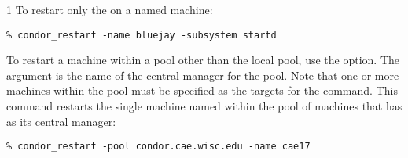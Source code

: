 \begin{ManPage}{\label{man-condor-restart}}{1}
To restart only the  on a named machine:
\begin{verbatim}
% condor_restart -name bluejay -subsystem startd
\end{verbatim}

To restart a machine within a pool
other than the local pool, use the  option.
The argument is the name of the central manager for the pool.
Note that one or more machines within the pool must be
specified as the targets for the command.
This command restarts
the single machine named  within the
pool of machines that has  as
its central manager:
\begin{verbatim}
% condor_restart -pool condor.cae.wisc.edu -name cae17
\end{verbatim}

\end{ManPage}
